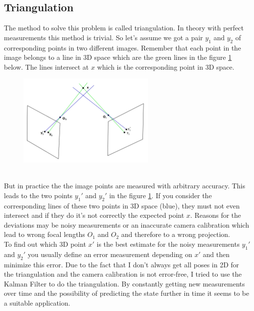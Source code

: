 \subsection{Triangulation}
The method to solve this problem is called triangulation. In theory with perfect measurements this method is trivial. So let's assume we got a pair $y_1$ and $y_2$ of corresponding points in two different images. Remember that each point in the image belongs to a line in 3D space which are the green lines in the figure \ref{fig:triangulation} below. The lines intersect at $x$ which is the corresponding point in 3D space. 
\begin{figure}[h]
	\centering
	\includegraphics[width=0.6\textwidth]{./images/TriangulationReal.jpg}
	\label{fig:triangulation}
\end{figure}\\
But in practice the the image points are measured with arbitrary accuracy. This leads to the two points $y_1'$ and $y_2'$ in the figure \ref{fig:triangulation}. If you consider the corresponding lines of these two points in 3D space (blue), they must not even intersect and if they do it's not correctly the expected point $x$. Reasons for the deviations may be noisy measurements or an inaccurate camera calibration which lead to wrong focal lengths $O_1$ and $O_2$ and therefore to a wrong projection. \\

To find out which 3D point $x'$  is the best estimate for the noisy measurements $y_1'$ and $y_2'$ you usually define an error measurement depending on $x'$ and then minimize this error. Due to the fact that I don't always get all poses in 2D for the triangulation and the camera calibration is not error-free, I tried to use the Kalman Filter to do the triangulation. By constantly getting new measurements over time and the possibility of predicting the state further in time it seems to be a suitable application. 


